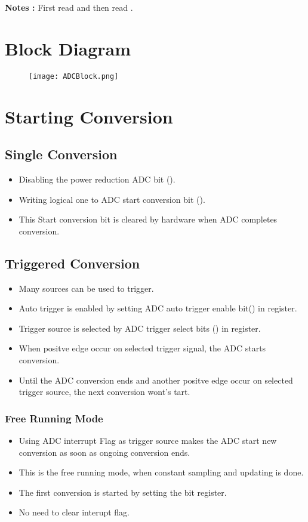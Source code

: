 \textbf{Notes :} First read  and then read .

\newpage
\section{Block Diagram}
\begin{figure}[H]
    \centering
    \texttt{[image: ADCBlock.png]}
\end{figure}

\section{Starting Conversion}
\subsection{Single Conversion}
\begin{itemize}
    \item Disabling the power reduction ADC bit ().
    \item Writing logical one to ADC start conversion bit ().
    \item This Start conversion bit is cleared by hardware when ADC completes conversion.
\end{itemize}

\subsection{Triggered Conversion}
\begin{itemize}
    \item Many sources can be used to trigger.
    \item Auto trigger is enabled by setting ADC auto trigger enable bit() in  register.
    \item Trigger source is selected by ADC trigger select bits () in  register.
    \item When positve edge occur on selected trigger signal, the ADC starts conversion.
    \item Until the ADC conversion ends and another positve edge occur on selected trigger source, the next conversion wont's tart.
\end{itemize}

\subsubsection{Free Running Mode}
\begin{itemize}
    \item Using ADC interrupt Flag as trigger source makes the ADC start new conversion as soon as ongoing conversion ends.
    \item This is the free running mode, when constant sampling and updating is done.
    \item The first conversion is started by setting the  bit  register.
    \item No need to clear interupt flag.
\end{itemize}

